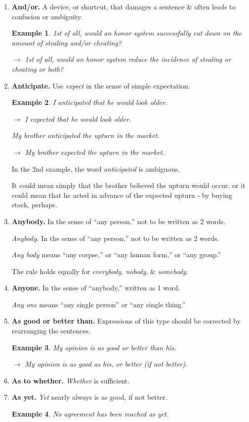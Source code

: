 \documentclass{article}
\newtheorem{example}{Example}
\begin{document}
\begin{enumerate}
	When, however, more than 2 are involved but each is considered  individually, {\it between} is preferred: ``an agreement between the 6 heirs.''
	\item {\bf And/or.} A device, or shortcut, that damages a sentence \& often leads to confusion or ambiguity.
	\begin{example}
		1st of all, would an honor system successfully cut down on the amount of stealing and/or cheating?
		
		$\to$ 1st of all, would an honor system reduce the incidence of stealing or cheating or both?
	\end{example}
	\item {\bf Anticipate.} Use {\it expect} in the sense of simple expectation.
	\begin{example}
		I anticipated that he would look older.
		
		$\to$ I expected that he would look older.
		
		My brother anticipated the upturn in the market.
		
		$\to$ My brother expected the upturn in the market.
	\end{example}
	In the 2nd example, the word {\it anticipated} is ambiguous.
	
	It could mean simply that the brother believed the upturn would occur, or it could mean that he acted in advance of the expected upturn - by buying stock, perhaps.
	\item {\bf Anybody.} In the sense of ``any person,'' not to be written as 2 words.
	
	{\it Anybody.} In the sense of ``any person,'' not to be written as 2 words.
	
	{\it Any body} means ``any corpse,'' or ``any human form,'' or ``any group.''
	
	The rule holds equally for {\it everybody, nobody}, \& {\it somebody}.
	\item {\bf Anyone.} In the sense of ``anybody,'' written as 1 word.
	
	{\it Any one} means ``any single person'' or ``any single thing.''
	\item {\bf As good or better than.} Expressions of this type should be corrected by rearranging the sentences.
	\begin{example}
		My opinion is as good or better than his.
		
		$\to$ My opinion is as good as his, or better (if not better).
	\end{example}
	\item {\bf As to whether.} {\it Whether} is sufficient.
	\item {\bf As yet.} {\it Yet} nearly always is as good, if not better.
	\begin{example}
		No agreement has been reached as yet.
		

\end{example}
\end{enumerate}
\end{document}
